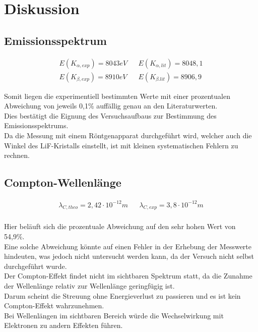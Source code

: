 \section{Diskussion}
\label{sec:Diskussion}

\subsection{Emissionsspektrum}
\label{subsec:disk_emission}

\begin{align*}
    E(K_{\alpha,exp}) = 8043 eV &&  E(K_{\alpha,lit}) = 8048,1 \\
    E(K_{\beta,exp}) = 8910 eV  &&  E(K_{\beta.lit}) = 8906,9
\end{align*}

Somit liegen die experimentiell bestimmten Werte mit einer prozentualen Abweichung von jeweils 0,1\% auffällig
genau an den Literaturwerten. \\
Dies bestätigt die Eignung des Versuchsaufbaus zur Bestimmung des Emissionsspektrums.\\
Da die Messung mit einem Röntgenapparat durchgeführt wird, welcher auch die Winkel des LiF-Kristalls einstellt, ist mit kleinen systematischen Fehlern zu rechnen.\\





\subsection{Compton-Wellenlänge}
\label{subsec:disk_compton}

\begin{align*}
    \lambda_{C, theo} = 2,42 \cdot 10^{-12}m && \lambda_{C, exp} = 3,8 \cdot 10^{-12}m \\
\end{align*}

Hier beläuft sich die prozentuale Abweichung auf den sehr hohen Wert von 54,9\%.\\
Eine solche Abweichung könnte auf einen Fehler in der Erhebung der Messwerte hindeuten, was jedoch nicht untersucht werden kann, 
da der Versuch nicht selbst durchgeführt wurde.\\
Der Compton-Effekt findet nicht im sichtbaren Spektrum statt, da die Zunahme der Wellenlänge
relativ zur Wellenlänge geringfügig ist.\\
Darum scheint die Streuung ohne Energieverlust zu passieren und es ist kein Compton-Effekt wahrzunehmen.\\
Bei Wellenlängen im sichtbaren Bereich würde die Wechselwirkung mit Elektronen zu andern Effekten führen.\\